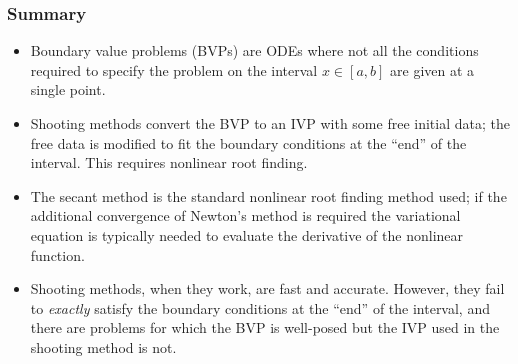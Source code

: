\documentclass{beamer}
\begin{document}
\begin{frame}
  \frametitle{Summary}

  \begin{itemize}
  \item Boundary value problems (BVPs) are ODEs where not all the
    conditions required to specify the problem on the interval $x \in
    [a,b]$ are given at a single point.
  \item Shooting methods convert the BVP to an IVP with some free
    initial data; the free data is modified to fit the boundary
    conditions at the ``end'' of the interval. This requires nonlinear
    root finding.
  \item The secant method is the standard nonlinear root finding
    method used; if the additional convergence of Newton's method is
    required the variational equation is typically needed to evaluate
    the derivative of the nonlinear function.
  \item Shooting methods, when they work, are fast and
    accurate. However, they fail to \emph{exactly} satisfy the
    boundary conditions at the ``end'' of the interval, and there are
    problems for which the BVP is well-posed but the IVP used in the
    shooting method is not.
  \end{itemize}

\end{frame}
\end{document}
